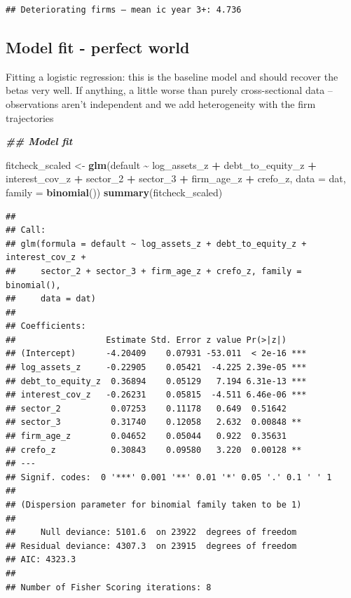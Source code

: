 \documentclass[
]{article}
\newenvironment{Shaded}{\begin{snugshade}}{\end{snugshade}}
\newcommand{\AttributeTok}[1]{\textcolor[rgb]{0.13,0.29,0.53}{#1}}
\newcommand{\DocumentationTok}[1]{\textcolor[rgb]{0.56,0.35,0.01}{\textbf{\textit{#1}}}}
\newcommand{\FunctionTok}[1]{\textcolor[rgb]{0.13,0.29,0.53}{\textbf{#1}}}
\newcommand{\NormalTok}[1]{#1}
\newcommand{\OtherTok}[1]{\textcolor[rgb]{0.56,0.35,0.01}{#1}}
\newcommand{\SpecialCharTok}[1]{\textcolor[rgb]{0.81,0.36,0.00}{\textbf{#1}}}
\begin{document}
\begin{verbatim}
## Deteriorating firms — mean ic year 3+: 4.736
\end{verbatim}

\subsection{Model fit - perfect world}\label{model-fit---perfect-world}

Fitting a logistic regression: this is the baseline model and should
recover the betas very well. If anything, a little worse than purely
cross-sectional data -- observations aren't independent and we add
heterogeneity with the firm trajectories

\begin{Shaded}
\begin{Highlighting}[]
\DocumentationTok{\#\# Model fit}

\NormalTok{fitcheck\_scaled }\OtherTok{\textless{}{-}} \FunctionTok{glm}\NormalTok{(default }\SpecialCharTok{\textasciitilde{}}\NormalTok{ log\_assets\_z }\SpecialCharTok{+}\NormalTok{ debt\_to\_equity\_z }\SpecialCharTok{+}\NormalTok{ interest\_cov\_z }\SpecialCharTok{+} 
\NormalTok{                         sector\_2 }\SpecialCharTok{+}\NormalTok{ sector\_3 }\SpecialCharTok{+}\NormalTok{ firm\_age\_z }\SpecialCharTok{+}\NormalTok{ crefo\_z,}
                       \AttributeTok{data =}\NormalTok{ dat, }\AttributeTok{family =} \FunctionTok{binomial}\NormalTok{())}
\FunctionTok{summary}\NormalTok{(fitcheck\_scaled)}
\end{Highlighting}
\end{Shaded}

\begin{verbatim}
## 
## Call:
## glm(formula = default ~ log_assets_z + debt_to_equity_z + interest_cov_z + 
##     sector_2 + sector_3 + firm_age_z + crefo_z, family = binomial(), 
##     data = dat)
## 
## Coefficients:
##                  Estimate Std. Error z value Pr(>|z|)    
## (Intercept)      -4.20409    0.07931 -53.011  < 2e-16 ***
## log_assets_z     -0.22905    0.05421  -4.225 2.39e-05 ***
## debt_to_equity_z  0.36894    0.05129   7.194 6.31e-13 ***
## interest_cov_z   -0.26231    0.05815  -4.511 6.46e-06 ***
## sector_2          0.07253    0.11178   0.649  0.51642    
## sector_3          0.31740    0.12058   2.632  0.00848 ** 
## firm_age_z        0.04652    0.05044   0.922  0.35631    
## crefo_z           0.30843    0.09580   3.220  0.00128 ** 
## ---
## Signif. codes:  0 '***' 0.001 '**' 0.01 '*' 0.05 '.' 0.1 ' ' 1
## 
## (Dispersion parameter for binomial family taken to be 1)
## 
##     Null deviance: 5101.6  on 23922  degrees of freedom
## Residual deviance: 4307.3  on 23915  degrees of freedom
## AIC: 4323.3
## 
## Number of Fisher Scoring iterations: 8
\end{verbatim}
\end{document}
